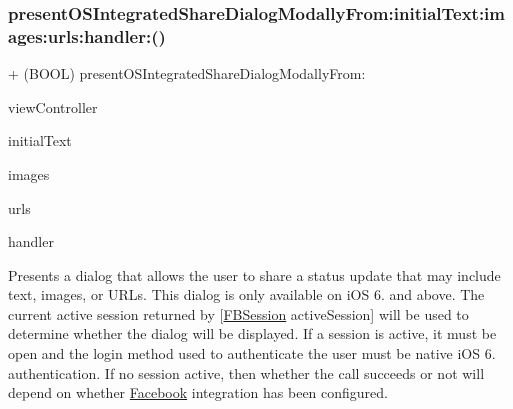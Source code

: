 \subsubsection{\texorpdfstring{present\+O\+S\+Integrated\+Share\+Dialog\+Modally\+From\+:initial\+Text\+:images\+:urls\+:handler\+:()}{presentOSIntegratedShareDialogModallyFrom:initialText:images:urls:handler:()}\hspace{0.1cm}{\footnotesize\ttfamily [4/5]}}
{\footnotesize\ttfamily + (B\+O\+OL) present\+O\+S\+Integrated\+Share\+Dialog\+Modally\+From\+: \begin{DoxyParamCaption}\item[{(U\+I\+View\+Controller $\ast$)}]{view\+Controller }\item[{initialText:(N\+S\+String $\ast$)}]{initial\+Text }\item[{images:(N\+S\+Array $\ast$)}]{images }\item[{urls:(N\+S\+Array $\ast$)}]{urls }\item[{handler:(F\+B\+O\+S\+Integrated\+Share\+Dialog\+Handler)}]{handler }\end{DoxyParamCaption}}

Presents a dialog that allows the user to share a status update that may include text, images, or U\+R\+Ls. This dialog is only available on i\+OS 6. and above. The current active session returned by \mbox{[}\hyperlink{interfaceFBSession}{F\+B\+Session} active\+Session\mbox{]} will be used to determine whether the dialog will be displayed. If a session is active, it must be open and the login method used to authenticate the user must be native i\+OS 6. authentication. If no session active, then whether the call succeeds or not will depend on whether \hyperlink{interfaceFacebook}{Facebook} integration has been configured.


